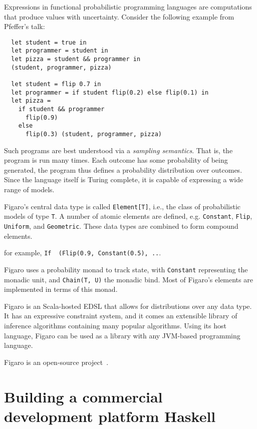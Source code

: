 \documentclass{jfp1}
\begin{document}
Expressions in functional probabilistic programming languages are
computations that produce values with uncertainty. Consider the following
example from Pfeffer's talk: 
\begin{verbatim}
  let student = true in
  let programmer = student in
  let pizza = student && programmer in 
  (student, programmer, pizza)

  let student = flip 0.7 in
  let programmer = if student flip(0.2) else flip(0.1) in
  let pizza = 
    if student && programmer 
      flip(0.9) 
    else
      flip(0.3) (student, programmer, pizza)
\end{verbatim}
Such programs are best understood via a \textit{sampling semantics}. That
is, the program is run many times. Each outcome has some probability of
being generated, the program thus defines a probability distribution over
outcomes. Since the language itself is Turing complete, it is capable of
expressing a wide range of models.

Figaro's central data type is called \texttt{Element[T]}, i.e., the class
of probabilistic models of type \texttt{T}. A number of atomic elements
are defined, e.g. \texttt{Constant}, \texttt{Flip}, \texttt{Uniform}, and
\texttt{Geometric}. These data types are combined to form compound
elements. 

for example, \texttt{If~~(Flip(0.9, Constant(0.5), ..}.

Figaro uses a probability monad to track state, with \texttt{Constant}
representing the monadic unit, and \texttt{Chain(T, U)} the monadic
bind. Most of Figaro's elements are implemented in terms of this monad.

Figaro is an Scala-hosted EDSL that allows for distributions over any data
type. It has an expressive constraint system, and it comes an extensible
library of inference algorithms containing many popular algorithms. Using
its host language, Figaro can be used as a library with any JVM-based
programming language.  

Figaro is an open-source project~\cite{CRA:2014:Figaro}.

\section{Building a commercial development platform Haskell}
\end{document}
